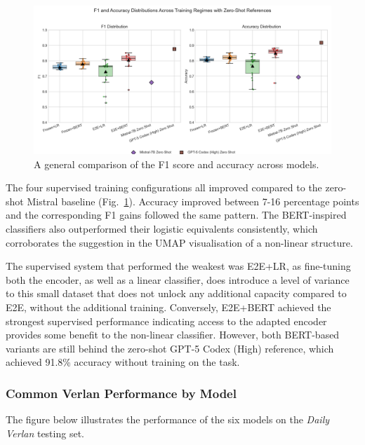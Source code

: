 \documentclass[12pt]{article}
\begin{document}
\begin{figure}[H]
  \begin{adjustwidth}{-2cm}{0cm}
  \centering
  \includegraphics[width=\textwidth]{figures/Accuracy_distribution_4settings.png}
  \caption{A general comparison of the F1 score and accuracy across models.}
  \label{fig:total-comparison}
  \end{adjustwidth}
\end{figure}

The four supervised training configurations all improved compared to the zero-shot Mistral baseline (Fig.~\ref{fig:total-comparison}). Accuracy improved between 7-16 percentage points and the corresponding F1 gains followed the same pattern. The BERT-inspired classifiers also outperformed their logistic equivalents consistently, which corroborates the suggestion in the UMAP visualisation of a non-linear structure.

The supervised system that performed the weakest was E2E+LR, as fine-tuning both the encoder, as well as a linear classifier, does introduce a level of variance to this small dataset that does not unlock any additional capacity compared to E2E, without the additional training. Conversely, E2E+BERT achieved the strongest supervised performance indicating access to the adapted encoder provides some benefit to the non-linear classifier. However, both BERT-based variants are still behind the zero-shot GPT-5 Codex (High) reference, which achieved 91.8\% accuracy without training on the task.

\subsubsection{Common Verlan Performance by Model}

The figure below illustrates the performance of the six models on the \textit{Daily Verlan} testing set.
\end{document}
